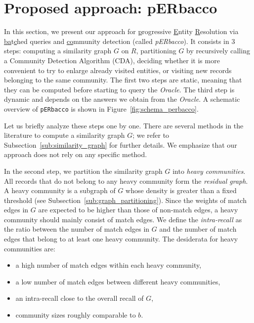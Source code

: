 \documentclass[sigconf, nonacm]{acmart}
\newcommand{\oracle}{\textit{Oracle}\xspace}
\newcommand{\window}{b}
\newcommand{\perbacco}{\texttt{pERbacco}\xspace}
\begin{document}
\section{Proposed approach: pERbacco}\label{sec:perbacco}

In this section, we present our approach for \underline{p}rogressive \underline{E}ntity \underline{R}esolution via \underline{ba}t\underline{c}hed queries and \underline{co}mmunity detection (called \emph{pERbacco}). 
It consists in 3 steps: computing a similarity graph $G$ on $R$, partitioning $G$ by recursively calling a Community Detection Algorithm (CDA), deciding whether it is more convenient to try to enlarge already visited entities, or visiting new records belonging to the same community. The first two steps are static, meaning that they can be computed before starting to query the \oracle. The third step is dynamic and depends on the answers we obtain from the \oracle. A schematic overview of \perbacco is shown in Figure~\ref{fig:schema_perbacco}.




Let us briefly analyze these steps one by one. There are several methods in the literature to compute a similarity graph $G$; we refer to Subsection~\ref{sub:similarity_graph} for further details. We emphasize that our approach does not rely on any specific method.




In the second step, we partition the similarity graph $G$ into \emph{heavy communities}. All records that do not belong to any heavy community form the \emph{residual graph}. A heavy community is a subgraph of $G$ whose density is greater than a fixed threshold (see Subsection~\ref{sub:graph_partitioning}). Since the weights of match edges in $G$ are expected to be higher than those of non-match edges, a heavy community should mainly consist of match edges. We define the \emph{intra-recall} as the ratio between the number of match edges in $G$ and the number of match edges that belong to at least one heavy community. The desiderata for heavy communities are:
\begin{itemize}
\item a high number of match edges within each heavy community,
\item a low number of match edges between different heavy communities,
\item an intra-recall close to the overall recall of $G$,
\item community sizes roughly comparable to $\window$.
\end{itemize}
\end{document}

